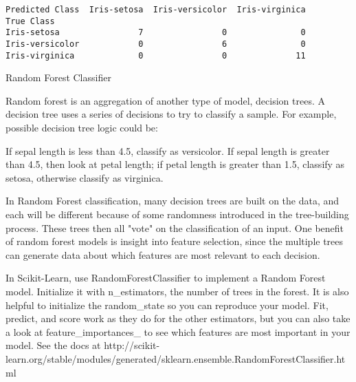 \documentclass[8pt]{extarticle}
\begin{document}
    \begin{Verbatim}[commandchars=\\\{\}]
Predicted Class  Iris-setosa  Iris-versicolor  Iris-virginica
True Class                                                   
Iris-setosa                7                0               0
Iris-versicolor            0                6               0
Iris-virginica             0                0              11

    \end{Verbatim}

    Random Forest Classifier

Random forest is an aggregation of another type of model, decision
trees. A decision tree uses a series of decisions to try to classify a
sample. For example, possible decision tree logic could be:

If sepal length is less than 4.5, classify as versicolor. If sepal
length is greater than 4.5, then look at petal length; if petal length
is greater than 1.5, classify as setosa, otherwise classify as
virginica.

In Random Forest classification, many decision trees are built on the
data, and each will be different because of some randomness introduced
in the tree-building process. These trees then all "vote" on the
classification of an input. One benefit of random forest models is
insight into feature selection, since the multiple trees can generate
data about which features are most relevant to each decision.

In Scikit-Learn, use RandomForestClassifier to implement a Random Forest
model. Initialize it with n\_estimators, the number of trees in the
forest. It is also helpful to initialize the random\_state so you can
reproduce your model. Fit, predict, and score work as they do for the
other estimators, but you can also take a look at feature\_importances\_
to see which features are most important in your model. See the docs at
http://scikit-learn.org/stable/modules/generated/sklearn.ensemble.RandomForestClassifier.html
\end{document}
